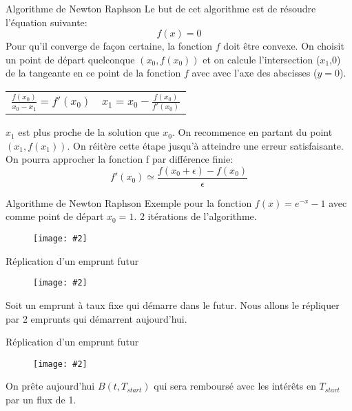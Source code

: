 \documentclass{beamer}
\newcommand{\FIG}[2]{\texttt{[image: \#2]}}
\begin{document}
\begin{frame}{Algorithme de Newton Raphson}
Le but de cet algorithme est de résoudre l'équation suivante:
\[
	f(x)=0
\]
Pour qu'il converge de façon certaine, la fonction $f$ doit être convexe.
On choisit un point de départ quelconque $(x_0,f(x_0))$ et on calcule l'intersection ($x_1$,0) de la tangeante en ce point de la fonction $f$ avec avec l'axe des abscisses ($y=0$).

\begin{center}
\begin{tabular}{c c}
$\frac{f(x_0)}{x_0-x_1}=f'(x_0)$
&
$x_1=x_0-\frac{f(x_0)}{f'(x_0)}$
\end{tabular}
\end{center}

$x_1$ est plus proche de la solution que $x_0$. On recommence en partant du point $(x_1,f(x_1))$. On réitère cette étape jusqu'à atteindre une erreur satisfaisante.\\
On pourra approcher la fonction f par différence finie:
\[
f'(x_0) \simeq \frac{f(x_0+\epsilon)-f(x_0)}{\epsilon}
\]
\end{frame}

\begin{frame}{Algorithme de Newton Raphson}
Exemple pour la fonction $f(x)=e^{-x}-1$ avec comme point de départ $x_0=1$. 2 itérations de l'algorithme.
\begin{center}
\begin{figure}[h]
\FIG{4in}{figures/newtonraphson.png}
\end{figure}
\end{center}
\end{frame}

\begin{frame}{Réplication d'un emprunt futur}
\begin{center}
\begin{figure}[h]
\FIG{4in}{figures/fwd_replic1.png}
\end{figure}
\end{center}
Soit un emprunt à taux fixe qui démarre dans le futur. Nous allons le répliquer par 2 emprunts qui démarrent aujourd'hui.
\end{frame}

\begin{frame}{Réplication d'un emprunt futur}
\begin{center}
\begin{figure}[h]
\FIG{4in}{figures/fwd_replic2.png}
\end{figure}
\end{center}
On prête aujourd'hui $B(t,T_{start})$ qui sera remboursé avec les intérêts en $T_{start}$ par un flux de 1.
\end{frame}
\end{document}
